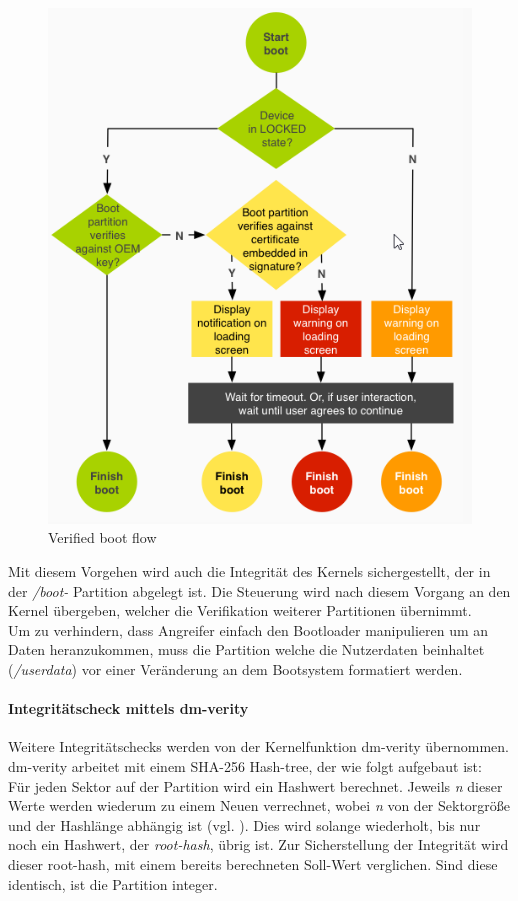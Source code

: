 	\begin{figure}[h]
		\centering
		\includegraphics[width=0.7\linewidth, height=0.5\textheight]{android_pages/graphics/VerifiedBoot}
		\caption[Verified boot flow\protect\cite{VerifyingBoot}]{Verified boot flow\protect\cite{VerifyingBoot}}
		\label{fig:VerifiedBoot}
	\end{figure}
	
\begin{flushleft}
	Mit diesem Vorgehen wird auch die Integrität des Kernels sichergestellt, der in der \textit{/boot-} Partition abgelegt ist. Die Steuerung wird nach diesem Vorgang an den Kernel übergeben, welcher die Verifikation weiterer Partitionen übernimmt.\newline\\

	Um zu verhindern, dass Angreifer einfach den Bootloader manipulieren um an Daten heranzukommen, muss die Partition welche die Nutzerdaten beinhaltet (\textit{/userdata}) vor einer Veränderung an dem Bootsystem formatiert werden.
\end{flushleft}
	
	\paragraph{Integritätscheck mittels dm-verity}
	Weitere Integritätschecks werden von der Kernelfunktion dm-verity übernommen.
	dm-verity arbeitet mit einem SHA-256 Hash-tree, der wie folgt aufgebaut ist:\\
	Für jeden Sektor auf der Partition wird ein Hashwert berechnet. Jeweils \textit{n} dieser Werte werden wiederum zu einem Neuen verrechnet, wobei \textit{n} von der Sektorgröße und der Hashlänge abhängig ist (vgl. \cite{dm-verity-doc}). Dies wird solange wiederholt, bis nur noch ein Hashwert, der \textit{root-hash}, übrig ist. Zur Sicherstellung der Integrität wird dieser root-hash, mit einem bereits berechneten Soll-Wert verglichen. Sind diese identisch, ist die Partition integer.
	
